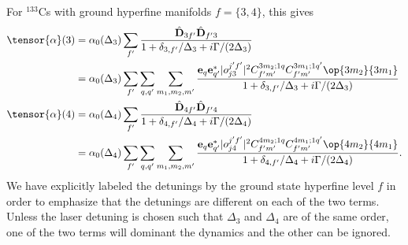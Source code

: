 \documentclass[]{report}
\begin{document}
For ${}^{133}$Cs with ground hyperfine manifolds $f = \{3,4\}$, this gives
\begin{align}
\tensor{\alpha}(3) 
		& = \alpha_0(\Delta_{3}) \sum_{f'} \frac{ \hat{\mathbf{D}}_{3 f'} \hat{\mathbf{D}}_{f' 3}}{ 1 + \delta_{3, f'} / \Delta_{3} + i \Gamma/(2\Delta_3) } \\
		&= \alpha_0(\Delta_{3}) \sum_{f'} \sum_{q,q'} \sum_{m_1, m_2, m'}\frac{ \mathbf{e}_q \mathbf{e}^*_{q'} | o^{j'f'}_{j3} |^2 C^{3m_2;1q}_{f'm'} C^{3m_1;1q'}_{f'm'} \op{3 m_2}{3 m_1}}{ 1 + \delta_{3, f'} / \Delta_{3} + i \Gamma/(2\Delta_3) }\\
\tensor{\alpha}(4) &=\alpha_0(\Delta_{4}) \sum_{f'} \frac{ \hat{\mathbf{D}}_{4 f'} \hat{\mathbf{D}}_{f' 4}}{ 1 + \delta_{4, f'} / \Delta_{4} + i \Gamma/(2\Delta_4) }\\
	 &= \alpha_0(\Delta_{4}) \sum_{f'} \sum_{q,q'} \sum_{m_1, m_2, m'}\frac{ \mathbf{e}_q \mathbf{e}^*_{q'} | o^{j'f'}_{j4} |^2 C^{4m_2;1q}_{f'm'} C^{4m_1;1q'}_{f'm'} \op{4 m_2}{4 m_1}}{ 1 + \delta_{4, f'} / \Delta_{4} + i \Gamma/(2\Delta_4)} .
\end{align}
We have explicitly labeled the detunings by the ground state hyperfine level $f$ in order to emphasize that the detunings are different on each of the two terms.  Unless the laser detuning is chosen such that $\Delta_3$ and $\Delta_4$ are of the same order, one of the two terms will dominant the dynamics and the other can be ignored.


\end{document}
